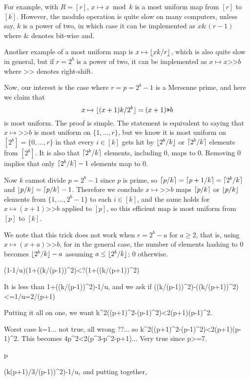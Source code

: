 For example, with $R=[r]$, $x\mapsto x\bmod k$ is a most uniform map
from $[r]$ to $[k]$. However, the modulo operation is quite slow on
many computers, unless say, $k$ is a power of two, in which case it
can be implemented as $x\texttt\& (r-1)$ where $\texttt\&$ denotes
bit-wise {\sc and}.

Another example of a most uniform map is $x\mapsto \lfloor {xk/r} \rfloor$,
which is also quite slow in general, but if $r=2^b$ is a power of two,
it can be implemented as $x\mapsto x\texttt{>>} b$ where $\texttt{>>}$ denotes
right-shift.

Now, our interest is the case where $r=p=2^b-1$ is a Mersenne prime,
and here we claim  that
\[x\mapsto \lfloor {(x+1)k/2^b} \rfloor=(x+1)\texttt{>>} b \]
is most uniform. The proof is simple. The statement is equivalent
to saying that $x\mapsto\texttt{>>} b$ is most uniform on 
$\{1,\ldots,r\}$, but we know it is most uniform on $[2^b]=\{0,\ldots,r\}$
in that every $i\in[k]$ gets hit by $\lfloor {2^b/k} \rfloor$ or $\lceil {2^b/k}\rceil$
elements from $[2^b]$. It is also that $\lceil {2^b/k}\rceil$ elements, including
$0$, maps to $0$. Removing $0$ implies that only $\lceil {2^b/k}\rceil-1$ elements map
to $0$.

Now $k$ cannot divide $p=2^b-1$ since $p$ is prime, so 
$\lceil {p/k}\rceil=\lceil {p+1/k}\rceil=\lceil {2^b/k}\rceil$
and $\lfloor {p/k} \rfloor=\lceil {p/k}\rceil-1$. Therefore we conclude $x\mapsto\texttt{>>} b$ 
maps $\lceil {p/k}\rceil$ or $\lfloor {p/k} \rfloor$ elements from $\{1,\ldots,2^b-1\}$ 
to each $i\in[k]$, and the same holds for $x\mapsto (x+1)\texttt{>>} b$ applied
to $[p]$, so this efficient map is most uniform from $[p]$ to $[k]$.

We note that this trick does not work when $r=2^b-a$ for $a\geq 2$, that is,
using $x\mapsto (x+a)\texttt{>>} b$, for in the general case, the number of elements 
hashing to $0$ becomes $\lfloor {2^b/k} \rfloor-a$ assuming $a\leq \lfloor {2^b/k} \rfloor$; 0 otherwise.


(1-1/u)(1+((k/(p-1))^2)<?(1+((k/(p+1))^2)

It is less than 1+((k/(p-1))^2)-1/u, and we ask
if ((k/(p-1))^2)-((k/(p+1))^2)<=1/u=2/(p+1)

Putting it all on one, we want k^2((p+1)^2-(p-1)^2)<2(p+1)(p-1)^2.

Worst case k=1... not true, all wrong ??... so k^2((p+1)^2-(p-1)^2)<2(p+1)(p-1)^2.
This becomes 4p^2<2(p^3-p^2-p+1)... Very true since p>=7.

p




(k(p+1)/3/(p-1))^2)-1/u, and putting together,






